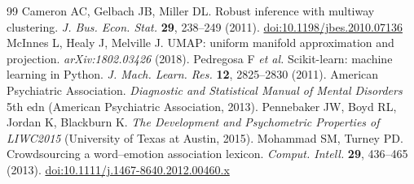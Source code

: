 \documentclass[11pt]{article}
\newcommand{\doi}[1]{\href{https://doi.org/#1}{doi:#1}}
\begin{document}
\begin{thebibliography}{99}
 Cameron AC, Gelbach JB, Miller DL. Robust inference with multiway clustering. \emph{J. Bus. Econ. Stat.} \textbf{29}, 238--249 (2011). \doi{10.1198/jbes.2010.07136}
 McInnes L, Healy J, Melville J. UMAP: uniform manifold approximation and projection. \emph{arXiv:1802.03426} (2018).
 Pedregosa F \emph{et al.} Scikit-learn: machine learning in Python. \emph{J. Mach. Learn. Res.} \textbf{12}, 2825--2830 (2011).
 American Psychiatric Association. \emph{Diagnostic and Statistical Manual of Mental Disorders} 5th edn (American Psychiatric Association, 2013).
 Pennebaker JW, Boyd RL, Jordan K, Blackburn K. \emph{The Development and Psychometric Properties of LIWC2015} (University of Texas at Austin, 2015).
 Mohammad SM, Turney PD. Crowdsourcing a word--emotion association lexicon. \emph{Comput. Intell.} \textbf{29}, 436--465 (2013). \doi{10.1111/j.1467-8640.2012.00460.x}
\end{thebibliography}
\end{document}

